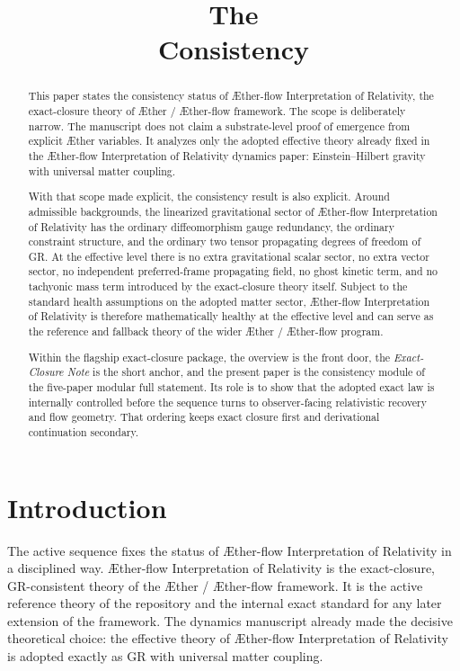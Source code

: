 \documentclass[11pt]{article}
\title{\textbf{The \TheoryName{}}\\[0.4em]
\large Consistency}
\author{}
\date{}
\newcommand{\Aether}{\AE{}ther}
\newcommand{\Aflow}{\AE{}ther-flow}
\newcommand{\TheoryName}{\Aflow{} Interpretation of Relativity}
\newcommand{\TheoryProgram}{\Aether{} / \Aflow{} framework}
\begin{document}
\maketitle

\begin{abstract}
This paper states the consistency status of \TheoryName{}, the exact-closure theory of \TheoryProgram{}. The scope is deliberately narrow. The manuscript does not claim a substrate-level proof of emergence from explicit \Aether{} variables. It analyzes only the adopted effective theory already fixed in the \TheoryName{} dynamics paper: Einstein--Hilbert gravity with universal matter coupling.

With that scope made explicit, the consistency result is also explicit. Around admissible backgrounds, the linearized gravitational sector of \TheoryName{} has the ordinary diffeomorphism gauge redundancy, the ordinary constraint structure, and the ordinary two tensor propagating degrees of freedom of GR. At the effective level there is no extra gravitational scalar sector, no extra vector sector, no independent preferred-frame propagating field, no ghost kinetic term, and no tachyonic mass term introduced by the exact-closure theory itself. Subject to the standard health assumptions on the adopted matter sector, \TheoryName{} is therefore mathematically healthy at the effective level and can serve as the reference and fallback theory of the wider \Aether{} / \Aflow{} program.

Within the flagship exact-closure package, the overview is the front door, the \emph{Exact-Closure Note} is the short anchor, and the present paper is the consistency module of the five-paper modular full statement. Its role is to show that the adopted exact law is internally controlled before the sequence turns to observer-facing relativistic recovery and flow geometry. That ordering keeps exact closure first and derivational continuation secondary.
\end{abstract}

\section{Introduction}

The active sequence fixes the status of \TheoryName{} in a disciplined way. \TheoryName{} is the exact-closure, GR-consistent theory of the \TheoryProgram{}. It is the active reference theory of the repository and the internal exact standard for any later extension of the framework. The dynamics manuscript already made the decisive theoretical choice: the effective theory of \TheoryName{} is adopted exactly as GR with universal matter coupling.
\end{document}

